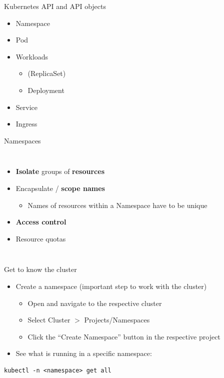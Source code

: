 \breakframe

\begin{frame}{Kubernetes API and API objects}
  \begin{itemize}
    \item Namespace
    \item Pod
    \item Workloads
      \begin{itemize}\item (ReplicaSet) \item Deployment\end{itemize}
    \item Service
    \item Ingress
  \end{itemize}
\end{frame}


\begin{frame}[fragile]{Namespaces}
  \begin{columns}[c]
      \begin{itemize}
        \item \textbf{Isolate} groups of \textbf{resources}
        \item Encapsulate / \textbf{scope names}
          \begin{itemize}\item Names of resources within a Namespace have to be unique\end{itemize}
        \item \textbf{Access control}
        \item Resource quotas
      \end{itemize}
  \end{columns}
\end{frame}

\begin{frame}[fragile]{Get to know the cluster}
  \begin{itemize}
    \item Create a namespace (important step to work with the \wsClusterPlatform{} cluster)
      \begin{itemize}
        \item Open \wsClusterPlatform{} and navigate to the respective cluster
        \item Select Cluster $>$ Projects/Namespaces
        \item Click the ``Create Namespace'' button in the respective project
      \end{itemize}
    \item See what is running in a specific namespace:
  \end{itemize}
  \begin{termbox}
\begin{lstlisting}[style=wstermstyle]
kubectl -n <namespace> get all
\end{lstlisting}
  \end{termbox}
\end{frame}

